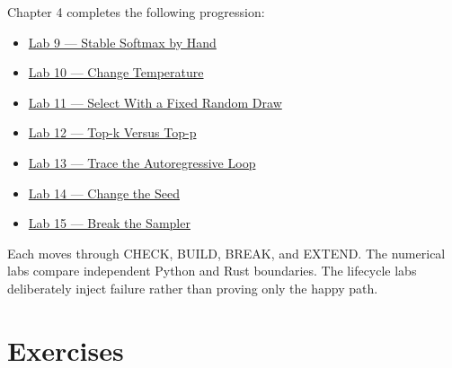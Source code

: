 Chapter 4 completes the following progression:

\begin{itemize}
\tightlist
\item
  \href{https://github.com/hermonai/inside-the-llm-engine/blob/astra-visual-rewrite/labs/lab-09-stable-softmax-by-hand.md}{Lab
  9 --- Stable Softmax by Hand}
\item
  \href{https://github.com/hermonai/inside-the-llm-engine/blob/astra-visual-rewrite/labs/lab-10-temperature.md}{Lab
  10 --- Change Temperature}
\item
  \href{https://github.com/hermonai/inside-the-llm-engine/blob/astra-visual-rewrite/labs/lab-11-fixed-categorical-draw.md}{Lab
  11 --- Select With a Fixed Random Draw}
\item
  \href{https://github.com/hermonai/inside-the-llm-engine/blob/astra-visual-rewrite/labs/lab-12-top-k-vs-top-p.md}{Lab
  12 --- Top-k Versus Top-p}
\item
  \href{https://github.com/hermonai/inside-the-llm-engine/blob/astra-visual-rewrite/labs/lab-13-build-the-autoregressive-loop.md}{Lab
  13 --- Trace the Autoregressive Loop}
\item
  \href{https://github.com/hermonai/inside-the-llm-engine/blob/astra-visual-rewrite/labs/lab-14-change-the-seed.md}{Lab
  14 --- Change the Seed}
\item
  \href{https://github.com/hermonai/inside-the-llm-engine/blob/astra-visual-rewrite/labs/lab-15-break-the-sampler.md}{Lab
  15 --- Break the Sampler}
\end{itemize}

Each moves through CHECK, BUILD, BREAK, and EXTEND. The numerical labs
compare independent Python and Rust boundaries. The lifecycle labs
deliberately inject failure rather than proving only the happy path.

\section{Exercises}\label{exercises-3}

